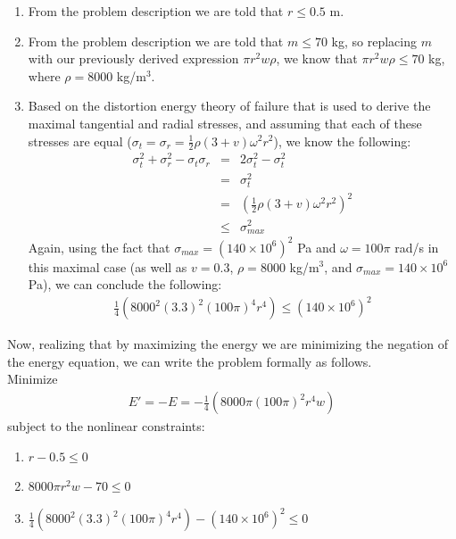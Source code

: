 \documentclass[11pt]{article}
\begin{document}
\begin{solution}
\begin{enumerate}
	\item From the problem description we are told that $r \leq 0.5$ m.
	\item From the problem description we are told that $m \leq 70$ kg, so replacing $m$ with our previously derived expression $\pi r^2 w \rho$, we know that $\pi r^2 w \rho \leq 70$ kg, where $\rho = 8000$ kg/m$^3$.
	\item Based on the distortion energy theory of failure that is used to derive the maximal tangential and radial stresses, and assuming that each of these stresses are equal ($\sigma_t = \sigma_r = \frac{1}{2}\rho(3 + v)\omega^2r^2$), we know the following:
\begin{eqnarray*}
\sigma_t^2 + \sigma_r^2 - \sigma_t\sigma_r & = & 2\sigma_t^2 - \sigma_t^2 \\
& = & \sigma_t^2 \\
& = & (\frac{1}{2}\rho(3 + v)\omega^2r^2)^2 \\
& \leq & \sigma_{max}^2
\end{eqnarray*}
Again, using the fact that $\sigma_{max} = (140 \times 10^6)^2$ Pa and $\omega = 100\pi$ rad/s in this maximal case (as well as $v = 0.3$, $\rho = 8000$ kg/m$^3$, and $\sigma_{max} = 140 \times 10^6$ Pa), we can conclude the following:
\begin{eqnarray*}
\frac{1}{4}(8000^2(3.3)^2(100\pi)^4r^4) \leq (140 \times 10^6)^2
\end{eqnarray*}
\end{enumerate}
Now, realizing that by maximizing the energy we are minimizing the negation of the energy equation, we can write the problem formally as follows. \\

Minimize
\begin{eqnarray*}
E' = -E = -\frac{1}{4}(8000\pi(100\pi)^2r^4 w) 
\end{eqnarray*}
subject to the nonlinear constraints:
\begin{enumerate}
	\item $r - 0.5 \leq 0$
	\item $8000\pi r^2 w  - 70 \leq 0$
	\item $\frac{1}{4}(8000^2(3.3)^2(100\pi)^4r^4) - (140 \times 10^6)^2 \leq 0$
\end{enumerate}
\end{solution}
\end{document}
